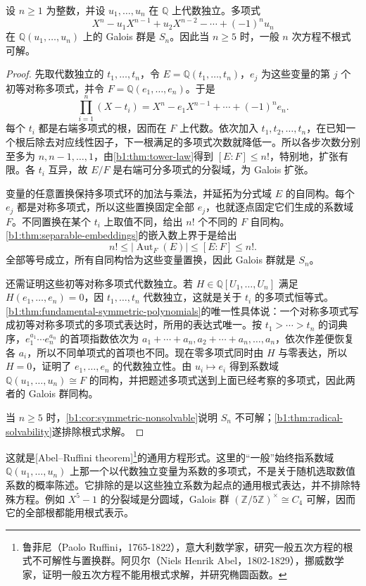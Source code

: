 \begin{theorem}[一般方程]\label{b1:thm:generic-equation}
	设 \(n\geq1\) 为整数，并设 \(u_1,\ldots,u_n\) 在 \(\mathbb Q\) 上代数独立。多项式
	\[
		X^n-u_1X^{n-1}+u_2X^{n-2}-\cdots+(-1)^nu_n
	\]
	在 \(\mathbb Q(u_1,\ldots,u_n)\) 上的 Galois 群是 \(S_n\)。因此当 \(n\geq5\) 时，一般 \(n\) 次方程不根式可解。
\end{theorem}
\begin{proof}
	先取代数独立的 \(t_1,\ldots,t_n\)，令 \(E=\mathbb Q(t_1,\ldots,t_n)\)，\(e_j\) 为这些变量的第 \(j\) 个初等对称多项式，并令 \(F=\mathbb Q(e_1,\ldots,e_n)\)。于是
	\[
		\prod_{i=1}^n(X-t_i)=X^n-e_1X^{n-1}+\cdots+(-1)^ne_n.
	\]
	每个 \(t_i\) 都是右端多项式的根，因而在 \(F\) 上代数。依次加入 \(t_1,t_2,\ldots,t_n\)，在已知一个根后除去对应线性因子，下一根满足的多项式次数就降低一。所以各步次数分别至多为 \(n,n-1,\ldots,1\)，由\cref{b1:thm:tower-law}得到 \([E:F]\leq n!\)，特别地，扩张有限。各 \(t_i\) 互异，故 \(E/F\) 是右端可分多项式的分裂域，为 Galois 扩张。

	变量的任意置换保持多项式环的加法与乘法，并延拓为分式域 \(E\) 的自同构。每个 \(e_j\) 都是对称多项式，所以这些置换固定全部 \(e_j\)，也就逐点固定它们生成的系数域 \(F\)。不同置换在某个 \(t_i\) 上取值不同，给出 \(n!\) 个不同的 \(F\) 自同构。\cref{b1:thm:separable-embeddings}的嵌入数上界于是给出
	\[
		n!\leq|\operatorname{Aut}_F(E)|\leq[E:F]\leq n!.
	\]
	全部等号成立，所有自同构恰为这些变量置换，因此 Galois 群就是 \(S_n\)。

	还需证明这些初等对称多项式代数独立。若 \(H\in\mathbb Q[U_1,\ldots,U_n]\) 满足 \(H(e_1,\ldots,e_n)=0\)，因 \(t_1,\ldots,t_n\) 代数独立，这就是关于 \(t_i\) 的多项式恒等式。\cref{b1:thm:fundamental-symmetric-polynomials}的唯一性具体说：一个对称多项式写成初等对称多项式的多项式表达时，所用的表达式唯一。按 \(t_1>\cdots>t_n\) 的词典序，\(e_1^{a_1}\cdots e_n^{a_n}\) 的首项指数依次为 \(a_1+\cdots+a_n,a_2+\cdots+a_n,\ldots,a_n\)，依次作差便恢复各 \(a_i\)，所以不同单项式的首项也不同。现在零多项式同时由 \(H\) 与零表达，所以 \(H=0\)，证明了 \(e_1,\ldots,e_n\) 的代数独立性。由 \(u_i\mapsto e_i\) 得到系数域 \(\mathbb Q(u_1,\ldots,u_n)\cong F\) 的同构，并把题述多项式送到上面已经考察的多项式，因此两者的 Galois 群同构。

	当 \(n\geq5\) 时，\cref{b1:cor:symmetric-nonsolvable}说明 \(S_n\) 不可解；\cref{b1:thm:radical-solvability}遂排除根式求解。
\end{proof}

这就是[Abel--Ruffini theorem]\footnote{鲁菲尼（Paolo Ruffini，1765-1822），意大利数学家，研究一般五次方程的根式不可解性与置换群。阿贝尔（Niels Henrik Abel，1802-1829），挪威数学家，证明一般五次方程不能用根式求解，并研究椭圆函数。}的通用方程形式。这里的“一般”始终指系数域 \(\mathbb Q(u_1,\ldots,u_n)\) 上那一个以代数独立变量为系数的多项式，不是关于随机选取数值系数的概率陈述。它排除的是以这些独立系数为起点的通用根式表达，并不排除特殊方程。例如 \(X^5-1\) 的分裂域是分圆域，Galois 群 \((\mathbb Z/5\mathbb Z)^\times\cong C_4\) 可解，因而它的全部根都能用根式表示。


